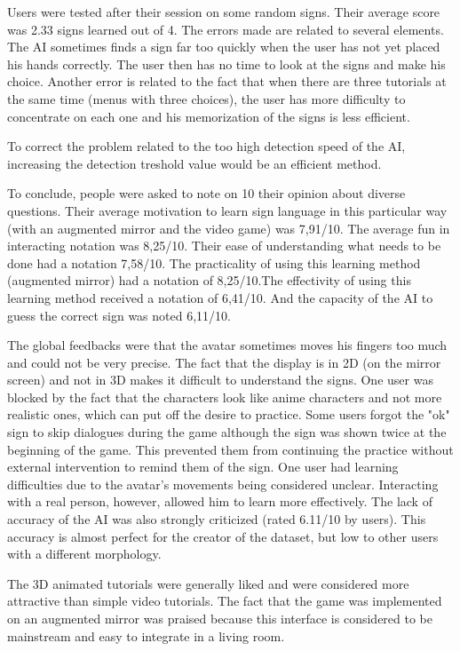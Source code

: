 Users were tested after their session on some random signs. Their average score was 2.33 signs learned out of 4. The errors made are related to several elements. The AI sometimes finds a sign far too quickly when the user has not yet placed his hands correctly. The user then has no time to look at the signs and make his choice. Another error is related to the fact that when there are three tutorials at the same time (menus with three choices), the user has more difficulty to concentrate on each one and his memorization of the signs is less efficient.

To correct the problem related to the too high detection speed of the AI, increasing the detection treshold value would be an efficient method.

To conclude, people were asked to note on 10 their opinion about diverse questions. Their average motivation to learn sign language in this particular way (with an augmented mirror and the video game) was 7,91/10.
The average fun in interacting notation was 8,25/10. Their ease of understanding what needs to be done had a notation 7,58/10. The practicality of using this learning method (augmented mirror) had a notation of 8,25/10.The effectivity of using this learning method received a notation of 6,41/10. And the capacity of the AI to guess the correct sign was noted 6,11/10.

The global feedbacks were that the avatar sometimes moves his fingers too much and could not be very precise. The fact that the display is in 2D (on the mirror screen) and not in 3D makes it difficult to understand the signs.
One user was blocked by the fact that the characters look like anime characters and not more realistic ones, which can put off the desire to practice.
Some users forgot the "ok" sign to skip dialogues during the game although the sign was shown twice at the beginning of the game. This prevented them from continuing the practice without external intervention to remind them of the sign. 
One user had learning difficulties due to the avatar's movements being considered unclear. Interacting with a real person, however, allowed him to learn more effectively. The lack of accuracy of the AI was also strongly criticized (rated 6.11/10 by users). This accuracy is almost perfect for the creator of the dataset, but low to other users with a different morphology.

The 3D animated tutorials were generally liked and were considered more attractive than simple video tutorials. The fact that the game was implemented on an augmented mirror was praised because this interface is considered to be mainstream and easy to integrate in a living room.


